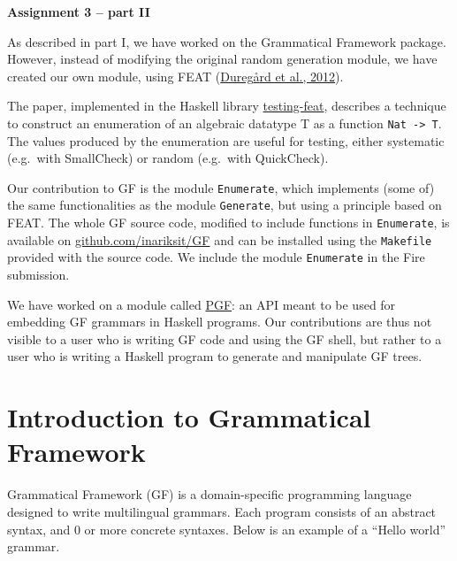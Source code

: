 \documentclass[]{article}
\author{}
\date{}
\begin{document}
\pagestyle{fancy}
\lhead{\textcolor{gray}{Simon Robillard \& Inari Listenmaa}}
\rhead{\textcolor{gray}{Advanced Functional Programming}}
\lfoot{\textcolor{gray}{}}
\rfoot{\thepage}
\renewcommand{\headrulewidth}{0.5pt} 
\renewcommand{\footrulewidth}{0.5pt} 
\fancyfoot[C]{\footnotesize \textcolor{gray}{}} 

\centerline{ {\Large \bf Assignment 3 -- part II} }
\vspace*{0.2cm}

As described in part I, we have worked on the Grammatical Framework
package. However, instead of modifying the original random generation
module, we have created our own module, using FEAT
(\href{http://dl.acm.org/citation.cfm?id=2364515}{Dureg{\aa}rd et al.,
2012}).

The paper, implemented in the Haskell library
\href{http://hackage.haskell.org/package/testing-feat}{testing-feat},
describes a technique to construct an enumeration of an algebraic
datatype T as a function \texttt{Nat -\textgreater{} T}. The values
produced by the enumeration are useful for testing, either systematic
(e.g.~with SmallCheck) or random (e.g.~with QuickCheck).

Our contribution to GF is the module \texttt{Enumerate}, which
implements (some of) the same functionalities as the module
\texttt{Generate}, but using a principle based on FEAT. The whole GF
source code, modified to include functions in \texttt{Enumerate}, is available on
\href{https://github.com/inariksit/GF}{github.com/inariksit/GF} and can
be installed using the \texttt{Makefile} provided with the source code. 
We include the module \texttt{Enumerate} in the Fire submission.

We have worked on a module called
\href{http://hackage.haskell.org/package/gf-3.6/docs/PGF.html}{PGF}: an
API meant to be used for embedding GF grammars in Haskell programs. 
Our contributions are thus not visible to a user who is writing GF code 
and using the GF shell, but rather to a user who is writing a Haskell 
program to generate and manipulate GF trees.

\section{Introduction to Grammatical
Framework}\label{introduction-to-grammatical-framework}

Grammatical Framework (GF) is a domain-specific programming language
designed to write multilingual grammars. Each program consists of an
abstract syntax, and 0 or more concrete syntaxes. Below is an example of
a ``Hello world'' grammar.
\end{document}
